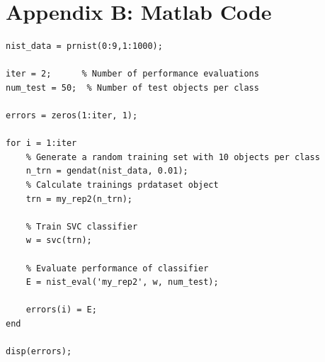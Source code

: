 \documentclass{article}
\begin{document}
\clearpage

\section{Appendix B: Matlab Code}

\begin{lstlisting}[caption=Script for performance evaluation of scenario 2,label=code:eval-script-scenario2]
nist_data = prnist(0:9,1:1000);

iter = 2;      % Number of performance evaluations
num_test = 50;  % Number of test objects per class

errors = zeros(1:iter, 1);

for i = 1:iter
    % Generate a random training set with 10 objects per class 
    n_trn = gendat(nist_data, 0.01);
    % Calculate trainings prdataset object
    trn = my_rep2(n_trn);
    
    % Train SVC classifier
    w = svc(trn);
    
    % Evaluate performance of classifier
    E = nist_eval('my_rep2', w, num_test);
    
    errors(i) = E;
end

disp(errors);
\end{lstlisting}


\nocite{*}

\end{document}
